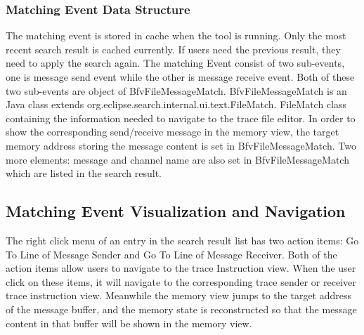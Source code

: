 \subsubsection{Matching Event Data Structure}
The matching event is stored in cache when the tool is running. Only the most recent search result is cached currently. If users need the previous result, they need to apply the search again. The matching Event consist of two sub-events, one is message send event while the other is message receive event. Both of these two sub-events are object of BfvFileMessageMatch. BfvFileMessageMatch is an Java class extends org.eclipse.search.internal.ui.text.FileMatch. FileMatch class containing the information needed to navigate to the trace file editor. In order to show the corresponding send/receive message in the memory view, the target memory address storing the message content is set in BfvFileMessageMatch. Two more elements: message and channel name are also set in BfvFileMessageMatch which are listed in the search result. 

\subsection{Matching Event Visualization and Navigation}
The right click menu of an entry in the search result list has two action items: Go To Line of Message Sender and Go To Line of Message Receiver. Both of the action items allow users to navigate to the trace Instruction view. When the user click on these items, it will navigate to the corresponding trace sender or receiver trace instruction view.  Meanwhile the memory view jumps to the target address of the message buffer, and the memory state is reconstructed so that the message content in that buffer will be shown in the memory view.

